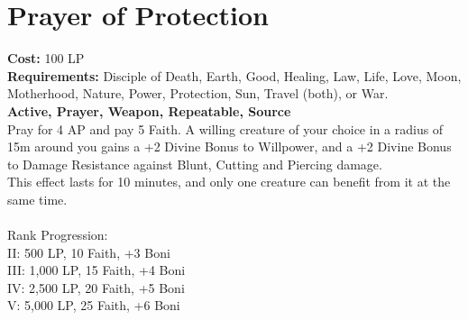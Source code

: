 \section{Prayer of Protection}\label{prayer:protection}
\textbf{Cost:} 100 LP\\
\textbf{Requirements:} Disciple of Death, Earth, Good, Healing, Law, Life, Love, Moon, Motherhood, Nature, Power, Protection, Sun, Travel (both), or War. \\
\textbf{Active, Prayer, Weapon, Repeatable, Source}\\
Pray for 4 AP and pay 5 Faith.
A willing creature of your choice in a radius of 15m around you gains a +2 Divine Bonus to Willpower, and a +2 Divine Bonus to Damage Resistance against Blunt, Cutting and Piercing damage.\\
This effect lasts for 10 minutes, and only one creature can benefit from it at the same time.\\
\\
Rank Progression:\\
II: 500 LP, 10 Faith, +3 Boni\\
III: 1,000 LP, 15 Faith, +4 Boni\\
IV: 2,500 LP, 20 Faith, +5 Boni\\
V: 5,000 LP, 25 Faith, +6 Boni\\